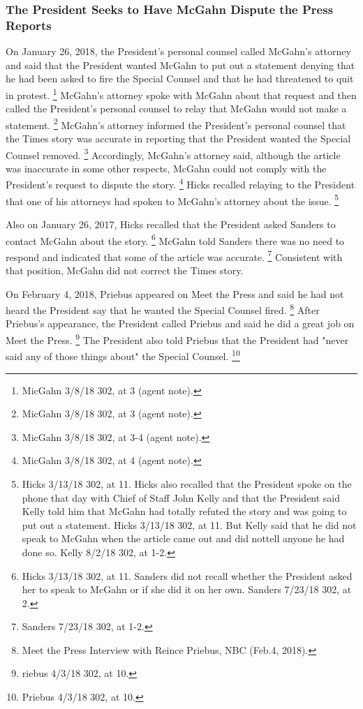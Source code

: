 \subsubsection{The President Seeks to Have McGahn Dispute the Press Reports}

On January 26, 2018, the President's personal counsel called McGahn's attorney and said that the President wanted McGahn to put out a statement denying that he had been asked to fire the Special Counsel and that he had threatened to quit in protest.%
\footnote{MicGahn 3/8/18 302, at 3 (agent note).}
McGahn's attorney spoke with McGahn about that request and then called the President's personal counsel to relay that McGahn would not make a statement.%
\footnote{MicGahn 3/8/18 302, at 3 (agent note).}
McGahn's attorney informed the President's personal counsel that the Times story was accurate in reporting that the President wanted the Special Counsel removed.%
\footnote{MicGahn 3/8/18 302, at 3-4 (agent note).}
Accordingly, McGahn's attorney said, although the article was inaccurate in some other respects, McGahn could not comply with the President's request to dispute the story.%
\footnote{MicGahn 3/8/18 302, at 4 (agent note).}
Hicks recalled relaying to the President that one of his attorneys had spoken to McGahn's attorney about the issue.%
\footnote{Hicks 3/13/18 302, at 11.
Hicks also recalled that the President spoke on the phone that day with Chief of Staff John Kelly and that the President said Kelly told him that McGahn had totally refuted the story and was going to put out a statement.
Hicks 3/13/18 302, at 11.
But Kelly said that he did not speak to McGahn when the article came out and did nottell anyone he had done so.
Kelly 8/2/18 302, at 1-2.}

Also on January 26, 2017, Hicks recalled that the President asked Sanders to contact McGahn about the story.%
\footnote{Hicks 3/13/18 302, at 11.
Sanders did not recall whether the President asked her to speak to McGahn or if she did it on her own.
Sanders 7/23/18 302, at 2.}
McGahn told Sanders there was no need to respond and indicated that some of the article was accurate.%
\footnote{Sanders 7/23/18 302, at 1-2.}
Consistent with that position, McGahn did not correct the Times story.

On February 4, 2018, Priebus appeared on Meet the Press and said he had not heard the President say that he wanted the Special Counsel fired.%
\footnote{Meet the Press Interview with Reince Priebus, NBC (Feb.4, 2018).}
After Priebus's appearance, the President called Priebus and said he did a great job on Meet the Press.%
\footnote{riebus 4/3/18 302, at 10.}
The President also told Priebus that the President had "never said any of those things about" the Special Counsel.%
\footnote{Priebus 4/3/18 302, at 10.}

